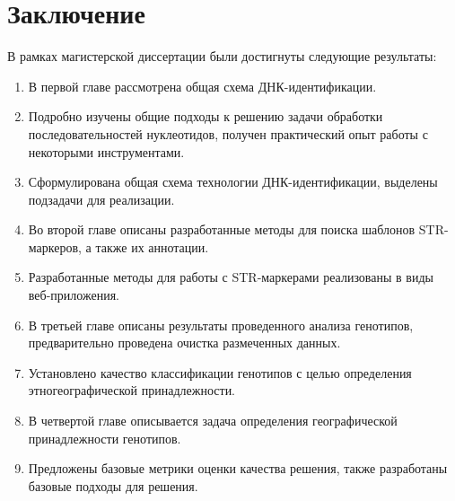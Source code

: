 \chapter*{Заключение}


В рамках магистерской диссертации были достигнуты следующие результаты:
\begin{enumerate}
    \item В первой главе рассмотрена общая схема ДНК-идентификации.
    \item Подробно изучены общие подходы к решению задачи обработки последовательностей нуклеотидов, получен практический опыт работы с некоторыми инструментами.
    \item Сформулирована общая схема технологии ДНК-идентификации, выделены подзадачи для реализации.
    \item Во второй главе описаны разработанные методы для поиска шаблонов STR-маркеров, а также их аннотации.
    \item Разработанные методы для работы с STR-маркерами реализованы в виды веб-приложения.
    \item В третьей главе описаны результаты проведенного анализа генотипов, предварительно проведена очистка размеченных данных.
    \item Установлено качество классификации генотипов с целью определения этногеографической принадлежности.
    \item В четвертой главе описывается задача определения географической принадлежности генотипов.
    \item Предложены базовые метрики оценки качества решения, также разработаны базовые подходы для решения.
\end{enumerate}
\clearpage

